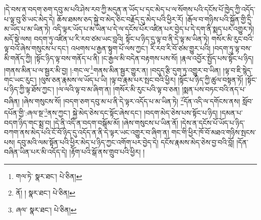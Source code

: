 །དེ་བས་ན་བདག་ཅག་དབུ་མ་པའི་ཤེས་རབ་ཀྱི་མདུན་ན་ཡོད་པ་དང་མེད་པ་ལ་སོགས་པའི་དངོས་པོ་ཁྱེད་ཀྱི་འདོད་པ་ལྟ་བུ་ཅི་ཡང་མེད་དེ། ཆོས་ཐམས་ཅད་སྐྱེ་བ་མེད་ཅིང་བརྗོད་དུ་མེད་པའི་ཕྱིར་རོ། །རྒོལ་བ་གཉིས་པའི་སྐྱོན་གྱི་དྲི་མ་ཡོད་པ་མ་ཡིན་ཏེ། འདི་ལྟར་ཡོད་པ་མ་ཡིན་པ་དེ་ལ་དངོས་པོར་འཛིན་པར་བྱེད་པ་དེ་དག་ནི་སྨད་པར་འགྱུར་ཏེ། མདོ་སྡེ་ལས། བདག་ཏུ་འཛིན་པ་རི་རབ་ཙམ་ཡང་བླའི། སྟོང་པ་ཉིད་དུ་ལྟ་བ་ནི་དེ་ལྟ་མ་ཡིན་ཏེ། གསོར་མི་རུང་བའི་ལྟ་བའོ་ཞེས་གསུངས་པ་དང་། འཕགས་པ་རྒྱན་སྟུག་པོ་ལས་ཀྱང་། རི་རབ་རི་བོ་ཙམ་གྱུར་པའི། །བདག་ཏུ་ལྟ་བས་མི་གནོད་ཀྱི། །སྟོང་ཉིད་ལྟ་བས་གནོད་པ་ནི། །ང་རྒྱལ་མི་བདེན་བརྟགས་པས་སོ། །རྣལ་འབྱོར་སྤྱོད་པས་སྟོང་པ་ཉིད། །གནས་མིན་པ་ལ་སྦྱར་མི་བྱ། །:གང་ལ་\footnote{གལ་ཏེ་  སྣར་ཐང་།  པེ་ཅིན། }གནས་མིན་སྦྱར་གྱུར་ན། །བདུད་རྩི་དུག་ཏུ་འགྱུར་བ་ཡིན། །ལྟ་བ་ཇི་སྙེད་གང་ཡང་རུང་། །ལུས་ཅན་རྣམས་ལ་ཡོད་པ་ཡི། །ལྟ་བ་རྣམ་པར་སྤང་བའི་ཕྱིར། །སྟོང་པ་ཉིད་ཀྱི་ཚུལ་བསྟན་ཏོ། །སྟོང་པ་ཉིད་ཀྱི་ལྟ་ཐོས་ཀྱང་། །ལ་ལའི་ལྟ་བ་མ་ཞིག་ན། །གསོར་མི་རུང་པའི་ལྟ་བ་ཅན། །སྨན་པས་བཏང་བའི་ནད་པ་བཞིན། །ཞེས་གསུངས་སོ། །བདག་ཅག་དབུ་མ་པ་ནི་དེ་ལྟར་འདོད་པ་མ་ཡིན་ཏེ། \footnote{ནོ། །   སྣར་ཐང་།  པེ་ཅིན། }དོན་འདི་ལ་དགོངས་ནས། སློབ་དཔོན་གྱི་:ཞལ་སྔ་\footnote{ཞལ་  སྣར་ཐང་།  པེ་ཅིན། }ནས་ཀྱང་། སྐྱེ་མེད་ཅེས་དང་སྟོང་ཞེས་དང་། །བདག་མེད་ཅེས་པས་སྟོང་པ་ཉིད། །དམན་པ་བདག་ཉིད་གང་སྨྲ་བ། །དེ་ནི་འདི་ན་བདག་བསྒོམ་མོ། །ཞེས་གསུངས་པ་ཡིན་ནོ། །དེས་ན་དངོས་པོ་ཡོད་པ་ཉིད་བཀག་ནས་མེད་པའི་ངོ་བོ་ཉིད་དུ་འདོད་ན་ནི་དེ་ལྟར་ཡང་འགྱུར་བ་ཞིག་ན། གང་གི་ཕྱིར་ཁོ་བོ་མཐའ་གཉིས་སྤངས་པས། དབུ་མའི་ལམ་སྟོན་པའི་ཕྱིར་མེད་པ་ཉིད་ཀྱང་འགོག་པར་བྱེད་དེ། དངོས་རྣམས་མེད་ཅེས་བྱ་བའི་བློ། །དོན་བཞིན་ཡིན་པར་མི་འདོད་དེ། །རྟོག་པའི་སྒོ་ནས་གྲུབ་པའི་ཕྱིར། །
